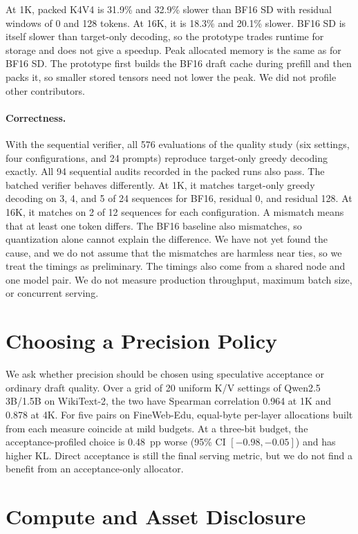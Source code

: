 \documentclass{article}
\begin{document}
At 1K, packed K4V4 is 31.9\% and 32.9\% slower than BF16 SD with residual
windows of 0 and 128 tokens. At 16K, it is 18.3\% and 20.1\% slower. BF16 SD is
itself slower than target-only decoding, so the prototype
trades runtime for storage and does not give a speedup. Peak allocated memory
is the same as for BF16 SD. The prototype first builds the BF16 draft cache
during prefill and then packs it, so smaller stored tensors need not lower the
peak. We did not profile other contributors.

\paragraph{Correctness.}
With the sequential verifier, all 576 evaluations of the quality study (six
settings, four configurations, and 24 prompts) reproduce target-only greedy
decoding exactly. All 94 sequential audits recorded in the packed runs also
pass. The batched verifier behaves differently. At 1K, it matches target-only
greedy decoding on 3, 4, and 5 of 24 sequences for BF16, residual 0, and
residual 128. At 16K, it matches on 2 of 12 sequences for each configuration. A
mismatch means that at least one token differs. The BF16 baseline also
mismatches, so quantization alone cannot explain the difference. We have not
yet found the cause, and we do not assume that the mismatches are harmless near
ties, so we treat the timings as preliminary. The timings also come from a
shared node and one model pair. We do not measure production throughput,
maximum batch size, or concurrent serving.

\section{Choosing a Precision Policy}
\label{app:objectives}

We ask whether precision should be chosen using speculative acceptance or
ordinary draft quality. Over a grid of 20 uniform K/V settings of Qwen2.5 3B/1.5B on
WikiText-2, the two have Spearman correlation 0.964 at 1K and 0.878 at 4K. For five
pairs on FineWeb-Edu, equal-byte per-layer allocations built from each measure
coincide at mild budgets. At a three-bit budget, the acceptance-profiled choice is 0.48~pp worse
(95\% CI $[-0.98,-0.05]$) and has higher KL. Direct
acceptance is still the final serving metric, but we do not find a benefit from
an acceptance-only allocator.

\section{Compute and Asset Disclosure}
\label{app:disclosure}
\end{document}

